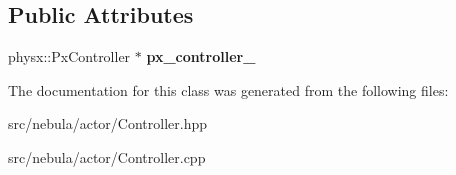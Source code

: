 \subsection*{\-Public \-Attributes}
\begin{DoxyCompactItemize}
\item 
\hypertarget{classneb_1_1Actor_1_1Controller_aa692b62e071660a4e182406efb10272b}{physx\-::\-Px\-Controller $\ast$ {\bfseries px\-\_\-controller\-\_\-}}\label{classneb_1_1Actor_1_1Controller_aa692b62e071660a4e182406efb10272b}

\end{DoxyCompactItemize}


\-The documentation for this class was generated from the following files\-:\begin{DoxyCompactItemize}
\item 
src/nebula/actor/\-Controller.\-hpp\item 
src/nebula/actor/\-Controller.\-cpp\end{DoxyCompactItemize}
